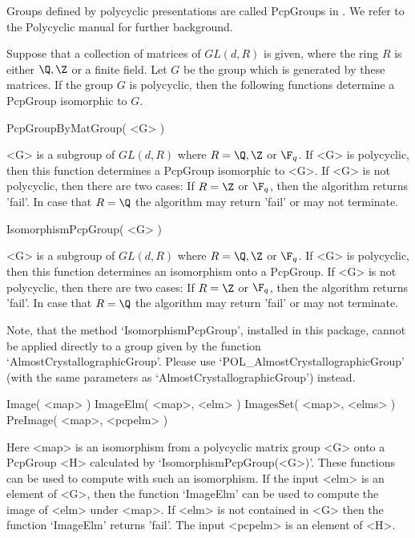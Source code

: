 
 
Groups defined by polycyclic presentations are called PcpGroups in
{\GAP}.
We refer to the Polycyclic manual \cite{polycyclic} for further
background.

Suppose that a collection of
matrices of $GL(d,R)$ is given, where the ring $R$ 
is either $\Q,\Z$ or a finite field.  Let $G$ be the group which is
generated by these matrices. If the group $G$ is polycyclic, then the
following functions determine a PcpGroup isomorphic to $G$.
 
\> PcpGroupByMatGroup( <G> )

<G> is  a subgroup of $GL(d,R)$ where $R=\Q,\Z $ or $\F_q$.
If <G> is polycyclic, then 
this function determines a PcpGroup isomorphic to <G>. 
If <G> is not polycyclic, then there are two cases: If $R=\Z$ or $\F_q$,
then the algorithm returns 'fail'. In case that $R=\Q$ the algorithm may
return 'fail' or may not terminate. 

\> IsomorphismPcpGroup( <G> )
 
<G> is  a subgroup of $GL(d,R)$ where $R=\Q,\Z $ or $\F_q$.
If <G> is polycyclic, then 
this function determines  an isomorphism
onto a PcpGroup. 
If <G> is not polycyclic, then there are two cases: If $R=\Z$ or $\F_q$,
then the algorithm returns 'fail'. In case that $R=\Q$ the algorithm may
return 'fail' or may not terminate. 

Note, that the method `IsomorphismPcpGroup', 
installed in this package, cannot be
applied directly to a group given by the function `AlmostCrystallographicGroup'.
Please use  `POL_AlmostCrystallographicGroup' (with the same
parameters as `AlmostCrystallographicGroup') instead. 

\> Image( <map> ) 
\> ImageElm( <map>, <elm> )
\> ImagesSet( <map>, <elms> )
\> PreImage( <map>, <pcpelm> )
 
Here <map> is an isomorphism from a polycyclic matrix group <G>
onto a PcpGroup <H> calculated
by `IsomorphismPcpGroup(<G>)'.
These functions can be used to compute with such an isomorphism. 
If the input <elm>  is an element of <G>, then the function `ImageElm'
 can be used to compute the image of <elm> under <map>. 
If <elm> is not contained in <G>
then the function `ImageElm' returns 'fail'. 
The input <pcpelm> is an element
of <H>. 

